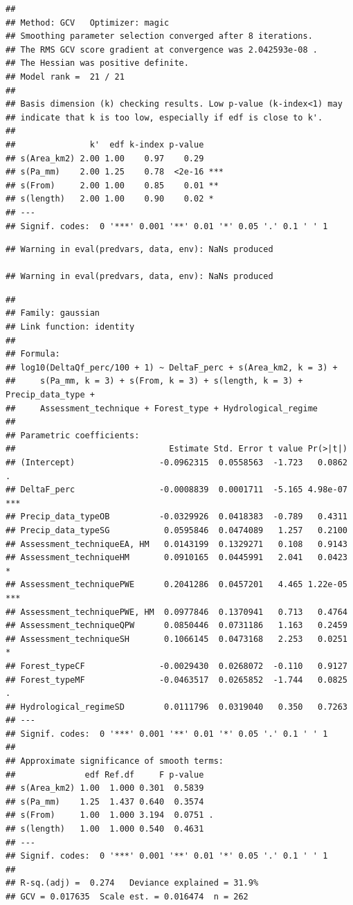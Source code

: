\documentclass[]{elsarticle} %
\begin{document}
\begin{verbatim}
## 
## Method: GCV   Optimizer: magic
## Smoothing parameter selection converged after 8 iterations.
## The RMS GCV score gradient at convergence was 2.042593e-08 .
## The Hessian was positive definite.
## Model rank =  21 / 21 
## 
## Basis dimension (k) checking results. Low p-value (k-index<1) may
## indicate that k is too low, especially if edf is close to k'.
## 
##               k'  edf k-index p-value    
## s(Area_km2) 2.00 1.00    0.97    0.29    
## s(Pa_mm)    2.00 1.25    0.78  <2e-16 ***
## s(From)     2.00 1.00    0.85    0.01 ** 
## s(length)   2.00 1.00    0.90    0.02 *  
## ---
## Signif. codes:  0 '***' 0.001 '**' 0.01 '*' 0.05 '.' 0.1 ' ' 1
\end{verbatim}

\begin{verbatim}
## Warning in eval(predvars, data, env): NaNs produced

## Warning in eval(predvars, data, env): NaNs produced
\end{verbatim}

\begin{verbatim}
## 
## Family: gaussian 
## Link function: identity 
## 
## Formula:
## log10(DeltaQf_perc/100 + 1) ~ DeltaF_perc + s(Area_km2, k = 3) + 
##     s(Pa_mm, k = 3) + s(From, k = 3) + s(length, k = 3) + Precip_data_type + 
##     Assessment_technique + Forest_type + Hydrological_regime
## 
## Parametric coefficients:
##                               Estimate Std. Error t value Pr(>|t|)    
## (Intercept)                 -0.0962315  0.0558563  -1.723   0.0862 .  
## DeltaF_perc                 -0.0008839  0.0001711  -5.165 4.98e-07 ***
## Precip_data_typeOB          -0.0329926  0.0418383  -0.789   0.4311    
## Precip_data_typeSG           0.0595846  0.0474089   1.257   0.2100    
## Assessment_techniqueEA, HM   0.0143199  0.1329271   0.108   0.9143    
## Assessment_techniqueHM       0.0910165  0.0445991   2.041   0.0423 *  
## Assessment_techniquePWE      0.2041286  0.0457201   4.465 1.22e-05 ***
## Assessment_techniquePWE, HM  0.0977846  0.1370941   0.713   0.4764    
## Assessment_techniqueQPW      0.0850446  0.0731186   1.163   0.2459    
## Assessment_techniqueSH       0.1066145  0.0473168   2.253   0.0251 *  
## Forest_typeCF               -0.0029430  0.0268072  -0.110   0.9127    
## Forest_typeMF               -0.0463517  0.0265852  -1.744   0.0825 .  
## Hydrological_regimeSD        0.0111796  0.0319040   0.350   0.7263    
## ---
## Signif. codes:  0 '***' 0.001 '**' 0.01 '*' 0.05 '.' 0.1 ' ' 1
## 
## Approximate significance of smooth terms:
##              edf Ref.df     F p-value  
## s(Area_km2) 1.00  1.000 0.301  0.5839  
## s(Pa_mm)    1.25  1.437 0.640  0.3574  
## s(From)     1.00  1.000 3.194  0.0751 .
## s(length)   1.00  1.000 0.540  0.4631  
## ---
## Signif. codes:  0 '***' 0.001 '**' 0.01 '*' 0.05 '.' 0.1 ' ' 1
## 
## R-sq.(adj) =  0.274   Deviance explained = 31.9%
## GCV = 0.017635  Scale est. = 0.016474  n = 262
\end{verbatim}
\end{document}
